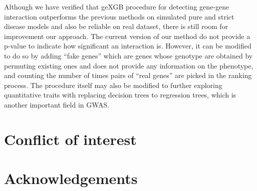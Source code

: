 \documentclass[11pt]{article}
\theoremstyle{plain}
\theoremstyle{definition}
\theoremstyle{remark}
\begin{document}
Although we have verified that geXGB procedure for detecting gene-gene interaction outperforms the previous methods on simulated pure and strict disease models and also be reliable on real dataset, there is still room for improvement our approach. The current version of our method do not provide a p-value to indicate how significant an interaction is. However, it can be modified to do so by adding ``fake genes'' which are genes whose genotype are obtained by permuting existing ones and does not provide any information on the phenotype, and counting the number of times pairs of ``real genes'' are picked in the ranking process. The procedure itself may also be modified to further exploring quantitative traits with replacing decision trees to regression trees, which is another important field in GWAS.


\section{Conflict of interest}

\section{Acknowledgements}
\end{document}
